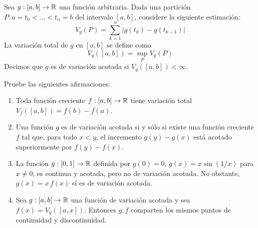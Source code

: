 \begin{exercise}
Sea $g : [a,b] \to \mathbb R$ una función arbitraria. Dada una partición $P : a = t_0 < \dots < t_n = b$ del intervalo $[a, b]$, considere la siguiente estimación:
$$V_g(P) = \sum_{k=1}^n |g(t_k) - g(t_{k-1})|$$
La variación total de $g$ en $[a,b]$ se define como
$$V_g([a,b]) = \sup_P V_g(P)$$
Decimos que $g$ es de variación acotada si $V_g([a, b]) < \infty$.

\newpage

\noindent Pruebe las siguientes afirmaciones:
\begin{enumerate}[label=(\alph*)]
    \item Toda función creciente $f : [a,b] \to \mathbb R$ tiene variación total $V_f([a,b]) = f(b) - f(a)$.
    
    \item Una función $g$ es de variación acotada si y sólo si existe una función creciente $f$ tal que, para todo $x < y$, el incremento $g(y) - g(x)$ está acotado superiormente por $f(y) - f(x)$.
    
    \item La función $g : [0,1] \to \mathbb R$ definida por $g(0) = 0$, $g(x) = x \sin(1/x)$ para $x \ne 0$, es continua y acotada, pero no de variación acotada. No obstante, $g(x) = x \, f(x)$ sí es de variación acotada.
    
    \item Sea $g : [a,b] \to \mathbb R$ una función de variación acotada y sea $f(x) = V_g([a,x])$. Entonces $g, f$ comparten los mismos puntos de continuidad y discontinuidad.
\end{enumerate}
\end{exercise}

